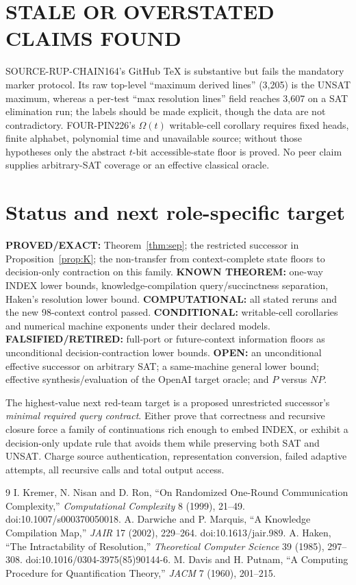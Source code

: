 \documentclass[11pt]{article}
\begin{document}
\section{STALE OR OVERSTATED CLAIMS FOUND}
SOURCE-RUP-CHAIN164's GitHub TeX is substantive but fails the mandatory marker
protocol.  Its raw top-level ``maximum derived lines'' (3,205) is the UNSAT
maximum, whereas a per-test ``max resolution lines'' field reaches 3,607 on a
SAT elimination run; the labels should be made explicit, though the data are
not contradictory.  FOUR-PIN226's $\Omega(t)$ writable-cell corollary requires
fixed heads, finite alphabet, polynomial time and unavailable source; without
those hypotheses only the abstract $t$-bit accessible-state floor is proved.
No peer claim supplies arbitrary-SAT coverage or an effective classical oracle.

\section{Status and next role-specific target}
\textbf{PROVED/EXACT:} Theorem~\ref{thm:sep}; the restricted successor in
Proposition~\ref{prop:K}; the non-transfer from context-complete state floors to
decision-only contraction on this family.  \textbf{KNOWN THEOREM:} one-way
INDEX lower bounds, knowledge-compilation query/succinctness separation,
Haken's resolution lower bound.  \textbf{COMPUTATIONAL:} all stated reruns and
the new 98-context control passed.  \textbf{CONDITIONAL:} writable-cell
corollaries and numerical machine exponents under their declared models.
\textbf{FALSIFIED/RETIRED:} full-port or future-context information floors as
unconditional decision-contraction lower bounds.  \textbf{OPEN:} an
unconditional effective successor on arbitrary SAT; a same-machine general
lower bound; effective synthesis/evaluation of the OpenAI target oracle; and
$P$ versus $NP$.

The highest-value next red-team target is a proposed unrestricted successor's
\emph{minimal required query contract}.  Either prove that correctness and
recursive closure force a family of continuations rich enough to embed INDEX,
or exhibit a decision-only update rule that avoids them while preserving both
SAT and UNSAT.  Charge source authentication, representation conversion,
failed adaptive attempts, all recursive calls and total output access.

\begin{thebibliography}{9}
 I. Kremer, N. Nisan and D. Ron,
``On Randomized One-Round Communication Complexity,''
\emph{Computational Complexity} 8 (1999), 21--49.
doi:10.1007/s000370050018.
 A. Darwiche and P. Marquis,
``A Knowledge Compilation Map,'' \emph{JAIR} 17 (2002), 229--264.
doi:10.1613/jair.989.
 A. Haken, ``The Intractability of Resolution,''
\emph{Theoretical Computer Science} 39 (1985), 297--308.
doi:10.1016/0304-3975(85)90144-6.
 M. Davis and H. Putnam,
``A Computing Procedure for Quantification Theory,'' \emph{JACM} 7 (1960),
201--215.
\end{thebibliography}
\end{document}
